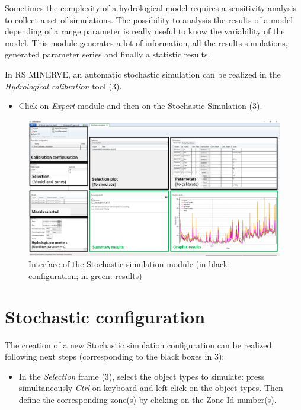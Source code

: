 \documentclass[
  letterpaper,
  DIV=11,
  numbers=noendperiod]{scrreprt}
\providecommand{\tightlist}{%
  \setlength{\itemsep}{0pt}\setlength{\parskip}{0pt}}\usepackage{longtable,booktabs,array}
\begin{document}
Sometimes the complexity of a hydrological model requires a sensitivity
analysis to collect a set of simulations. The possibility to analysis
the results of a model depending of a range parameter is really useful
to know the variability of the model. This module generates a lot of
information, all the results simulations, generated parameter series and
finally a statistic results.

In RS MINERVE, an automatic stochastic simulation can be realized in the
\emph{Hydrological calibration} tool (3).

\begin{itemize}
\tightlist
\item
  {Click on \emph{Expert} module and then on the Stochastic Simulation
  (3).}
\end{itemize}

\begin{figure}

{\centering \includegraphics{./figures/fig-stochastic_simulation_interface.png}

}

\caption{\label{fig-stochastic_simulation_interface}Interface of the
Stochastic simulation module (in black: configuration; in green:
results)}

\end{figure}

\hypertarget{stochastic-configuration}{%
\section{Stochastic configuration}\label{stochastic-configuration}}

The creation of a new Stochastic simulation configuration can be
realized following next steps (corresponding to the black boxes in 3):

\begin{itemize}
\tightlist
\item
  {In the \emph{Selection} frame (3), select the object types to
  simulate: press simultaneously \emph{Ctrl} on keyboard and left click
  on the object types. Then define the corresponding zone(s) by clicking
  on the Zone Id number(s).}
\end{itemize}
\end{document}
